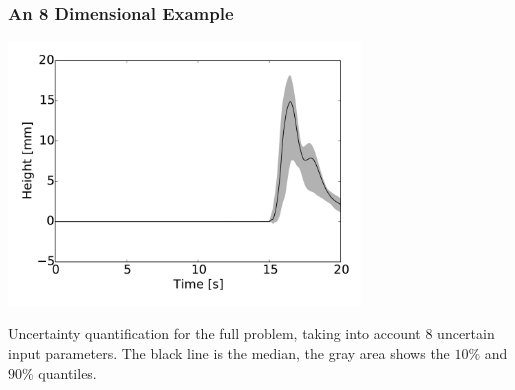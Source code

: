 \documentclass[11pt,ucs]{beamer}
\begin{document}
\begin{frame}\frametitle{An 8 Dimensional Example}

\begin{center}
\includegraphics[width=0.7\textwidth]{full_problem}
\end{center}

\small{
Uncertainty quantification for the full problem, taking into account $8$ uncertain input parameters. The black line is the median, the gray area shows the $10\%$ and $90\%$ quantiles.
}





\end{frame}
\end{document}
